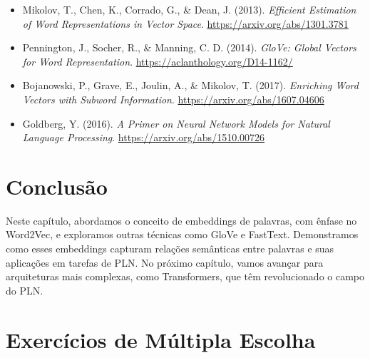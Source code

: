 \documentclass[14pt,a4paper,oneside]{book}
\begin{document}
\begin{itemize}
	\item Mikolov, T., Chen, K., Corrado, G., \& Dean, J. (2013). \textit{Efficient Estimation of Word Representations in Vector Space}. \url{https://arxiv.org/abs/1301.3781}
	\item Pennington, J., Socher, R., \& Manning, C. D. (2014). \textit{GloVe: Global Vectors for Word Representation}. \url{https://aclanthology.org/D14-1162/}
	\item Bojanowski, P., Grave, E., Joulin, A., \& Mikolov, T. (2017). \textit{Enriching Word Vectors with Subword Information}. \url{https://arxiv.org/abs/1607.04606}
	\item Goldberg, Y. (2016). \textit{A Primer on Neural Network Models for Natural Language Processing}. \url{https://arxiv.org/abs/1510.00726}
\end{itemize}

\section{Conclusão}

Neste capítulo, abordamos o conceito de embeddings de palavras, com ênfase no Word2Vec, e exploramos outras técnicas como GloVe e FastText. Demonstramos como esses embeddings capturam relações semânticas entre palavras e suas aplicações em tarefas de PLN. No próximo capítulo, vamos avançar para arquiteturas mais complexas, como Transformers, que têm revolucionado o campo do PLN.

\newpage

\section*{Exercícios de Múltipla Escolha}
\end{document}
